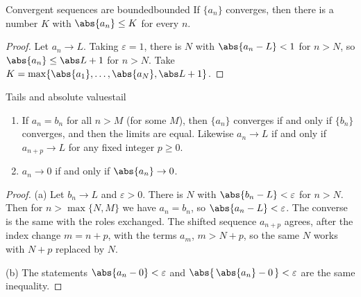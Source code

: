 \documentclass[11pt]{article}
\begin{document}
\begin{thm}{Convergent sequences are bounded}{bounded}
If $\{a_n\}$ converges, then there is a number $K$ with $\abs{a_n}\le K$ for every $n$.
\end{thm}
\begin{proof}
Let $a_n\to L$. Taking $\varepsilon=1$, there is $N$ with $\abs{a_n-L}<1$ for $n>N$, so $\abs{a_n}\le\abs L+1$ for $n>N$. Take $K=\max\{\abs{a_1},\dots,\abs{a_N},\abs L+1\}$.
\end{proof}

\begin{thm}{Tails and absolute values}{tail}
\begin{enumerate}[label=(\alph*)]
  \item If $a_n=b_n$ for all $n>M$ (for some $M$), then $\{a_n\}$ converges if and only if $\{b_n\}$ converges, and then the limits are equal. Likewise $a_n\to L$ if and only if $a_{n+p}\to L$ for any fixed integer $p\ge0$.
  \item $a_n\to0$ if and only if $\abs{a_n}\to0$.
\end{enumerate}
\end{thm}
\begin{proof}
(a) Let $b_n\to L$ and $\varepsilon>0$. There is $N$ with $\abs{b_n-L}<\varepsilon$ for $n>N$. Then for $n>\max\{N,M\}$ we have $a_n=b_n$, so $\abs{a_n-L}<\varepsilon$. The converse is the same with the roles exchanged. The shifted sequence $a_{n+p}$ agrees, after the index change $m=n+p$, with the terms $a_m$, $m>N+p$, so the same $N$ works with $N+p$ replaced by $N$.

(b) The statements $\abs{a_n-0}<\varepsilon$ and $\abs{\,\abs{a_n}-0\,}<\varepsilon$ are the same inequality.
\end{proof}
\end{document}
